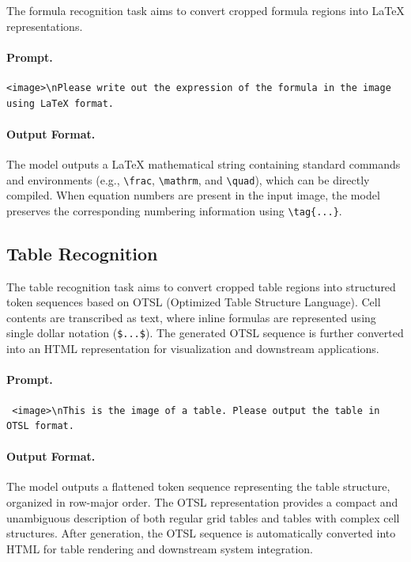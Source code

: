 \documentclass{fairmeta}
\begin{document}
The formula recognition task aims to convert cropped formula regions into \LaTeX{} representations.

\paragraph{Prompt.}
\begin{verbatim}
<image>\nPlease write out the expression of the formula in the image using LaTeX format.
\end{verbatim}

\paragraph{Output Format.}

The model outputs a \LaTeX{} mathematical string containing standard commands and environments (e.g., \verb|\frac|, \verb|\mathrm|, and \verb|\quad|), which can be directly compiled. When equation numbers are present in the input image, the model preserves the corresponding numbering information using \verb|\tag{...}|.


\subsection{Table Recognition}
\label{app:table_recognition}

The table recognition task aims to convert cropped table regions into structured token sequences based on OTSL (Optimized Table Structure Language). Cell contents are transcribed as text, where inline formulas are represented using single dollar notation (\verb|$...$|). The generated OTSL sequence is further converted into an HTML representation for visualization and downstream applications.

\paragraph{Prompt.}

\begin{verbatim} <image>\nThis is the image of a table. Please output the table in OTSL format.
\end{verbatim}

\paragraph{Output Format.}

The model outputs a flattened token sequence representing the table structure, organized in row-major order. The OTSL representation provides a compact and unambiguous description of both regular grid tables and tables with complex cell structures. After generation, the OTSL sequence is automatically converted into HTML for table rendering and downstream system integration.
\end{document}
